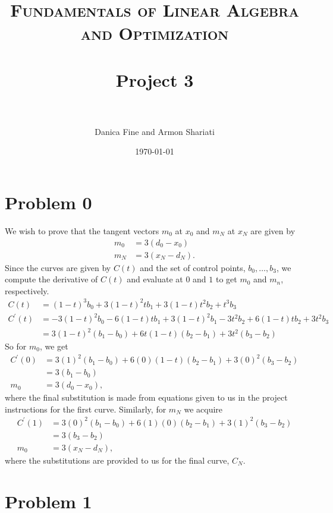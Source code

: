 \documentclass[paper=a4, fontsize=11pt]{scrartcl} %
\title{	
    \normalfont \normalsize 
    \textsc{Fundamentals of Linear Algebra and Optimization} \\ [25pt] %
    \horrule{0.5pt} \\[0.4cm] %
    \huge Project 3 \\ %
    \horrule{2pt} \\[0.5cm] %
}
\author{Danica Fine and Armon Shariati} %
\date{\normalsize\today} %
\begin{document}
\maketitle %


\section*{Problem 0}
\setcounter{section}{0}
\setcounter{subsection}{1}

We wish to prove that the tangent vectors $m_0$ at $x_0$ and $m_N$ at $x_N$ are given by
\begin{align*}
    m_0 &= 3(d_0 - x_0) \\
    m_N &= 3(x_N - d_N).
\end{align*}
Since the curves are given by $C(t)$ and the set of control points, $b_0,
\dots, b_3$, we compute the derivative of $C(t)$ and evaluate at $0$ and $1$ to
get $m_0$ and $m_n$, respectively.
\begin{align*}
    C(t) &=
    (1-t)^3 b_0 + 3(1-t)^2 t b_1 + 3(1-t)t^2 b_2 + t^3 b_3 \\
    C^{\prime}(t) &=
    -3(1-t)^2b_0 - 6(1-t)tb_1 + 3(1-t)^2b_1 -3t^2b_2 + 6(1-t)tb_2 +     3t^2b_3 \\
    &=
    3(1-t)^2(b_1 - b_0) + 6t(1-t)(b_2 - b_1) + 3t^2(b_3 - b_2)
\end{align*}
So for $m_0$, we get
\begin{align*}
    C^{\prime}(0) &=
    3(1)^2(b_1 - b_0) + 6(0)(1-t)(b_2 - b_1) + 3(0)^2(b_3 - b_2) \\
    &=
    3(b_1 - b_0) \\
    m_0 &= 3(d_0 - x_0),
\end{align*}
where the final substitution is made from equations given to us in the project
instructions for the first curve. Similarly, for $m_N$ we acquire
\begin{align*}
    C^{\prime}(1) &=
    3(0)^2(b_1 - b_0) + 6(1)(0)(b_2 - b_1) + 3(1)^2(b_3 - b_2) \\
    &=
    3(b_3 - b_2) \\
    m_0 &= 3(x_N - d_N),
\end{align*}
where the substitutions are provided to us for the final curve, $C_N$.


\section*{Problem 1}
\setcounter{section}{1}
\setcounter{subsection}{1}
\end{document}
